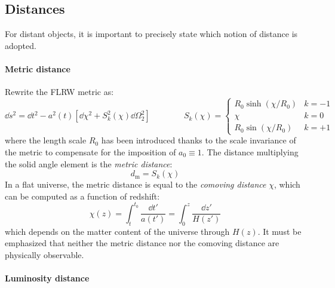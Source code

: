 \subsection{Distances}

For distant objects, it is important to precisely state which notion of distance is adopted.

\paragraph{Metric distance}

Rewrite the FLRW metric as:
\begin{equation*}
  \dd s^2 = \dd t^2 - a^2(t) \left[ \dd \chi^2 + S_k^2(\chi) \dd \Omega_2^2 \right]
  \qquad \qquad
  S_k(\chi) =
  \begin{cases}
    R_0 \sinh (\chi / R_0) & k = -1 \\
    \chi & k = 0 \\
    R_0 \sin (\chi / R_0) & k = + 1
  \end{cases}
\end{equation*}
where the length scale $ R_0 $ has been introduced thanks to the scale invariance of the metric to compensate for the imposition of $ a_0 \equiv 1 $. The distance multiplying the solid angle element is the \emph{metric distance}:
\begin{equation}
  d_\text{m} = S_k(\chi)
\end{equation}
In a flat universe, the metric distance is equal to the \emph{comoving distance} $ \chi $, which can be computed as a function of redshift:
\begin{equation}
  \chi(z) = \int_t^{t_0} \frac{\dd t'}{a(t')} = \int_0^z \frac{\dd z'}{H(z')}
\end{equation}
which depends on the matter content of the universe through $ H(z) $. It must be emphasized that neither the metric distance nor the comoving distance are physically observable.

\paragraph{Luminosity distance}

